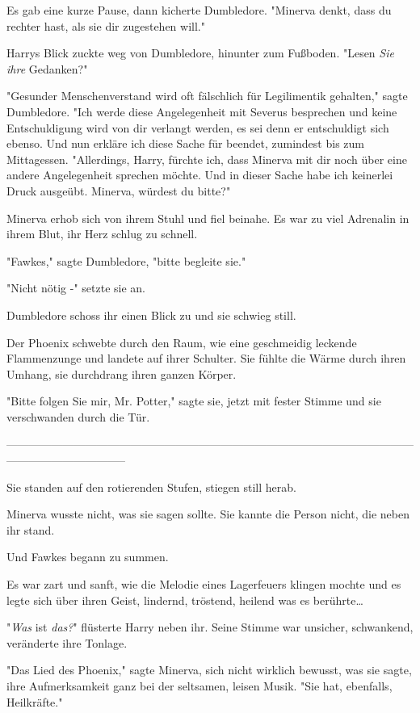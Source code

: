 {Es gab eine kurze Pause, dann kicherte Dumbledore. "Minerva denkt, dass du rechter hast, als sie dir zugestehen will."

Harrys Blick zuckte weg von Dumbledore, hinunter zum Fußboden. "Lesen \emph{Sie ihre} Gedanken?"

"Gesunder Menschenverstand wird oft fälschlich für Legilimentik gehalten," sagte Dumbledore. "Ich werde diese Angelegenheit mit Severus besprechen und keine Entschuldigung wird von dir verlangt werden, es sei denn er entschuldigt sich ebenso. Und nun erkläre ich diese Sache für beendet, zumindest bis zum Mittagessen. "Allerdings, Harry, fürchte ich, dass Minerva mit dir noch über eine andere Angelegenheit sprechen möchte. Und in dieser Sache habe ich keinerlei Druck ausgeübt. Minerva, würdest du bitte?"

Minerva erhob sich von ihrem Stuhl und fiel beinahe. Es war zu viel Adrenalin in ihrem Blut, ihr Herz schlug zu schnell.

"Fawkes," sagte Dumbledore, "bitte begleite sie."

"Nicht nötig -" setzte sie an.

Dumbledore schoss ihr einen Blick zu und sie schwieg still.

Der Phoenix schwebte durch den Raum, wie eine geschmeidig leckende Flammenzunge und landete auf ihrer Schulter. Sie fühlte die Wärme durch ihren Umhang, sie durchdrang ihren ganzen Körper.

"Bitte folgen Sie mir, Mr. Potter," sagte sie, jetzt mit fester Stimme und sie verschwanden durch die Tür.

--------------------------------------------------------------------------------------------------------------------------------------------

Sie standen auf den rotierenden Stufen, stiegen still herab.

Minerva wusste nicht, was sie sagen sollte. Sie kannte die Person nicht, die neben ihr stand.

Und Fawkes begann zu summen.

Es war zart und sanft, wie die Melodie eines Lagerfeuers klingen mochte und es legte sich über ihren Geist, lindernd, tröstend, heilend was es berührte…

"\emph{Was} ist \emph{das?}" flüsterte Harry neben ihr. Seine Stimme war unsicher, schwankend, veränderte ihre Tonlage.

"Das Lied des Phoenix," sagte Minerva, sich nicht wirklich bewusst, was sie sagte, ihre Aufmerksamkeit ganz bei der seltsamen, leisen Musik. "Sie hat, ebenfalls, Heilkräfte."

}
